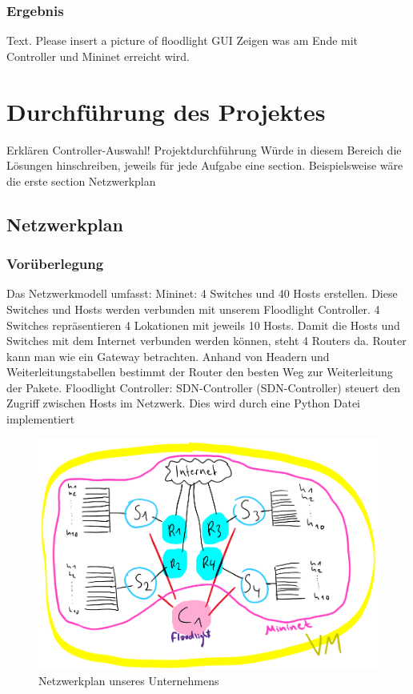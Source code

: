 \documentclass[fontsize=12pt,paper=a4,open=any,parskip=half,
  twoside=false,toc=listof,toc=bibliography,fleqn,leqno,
  captions=nooneline,captions=tableabove,british]{scrbook}
\begin{document}
\subsection{Ergebnis}
Text. Please insert a picture of floodlight GUI
Zeigen was am Ende mit Controller und Mininet erreicht wird.



\chapter{Durchführung des Projektes}
Erklären Controller-Auswahl!
Projektdurchführung
Würde in diesem Bereich die Lösungen hinschreiben, jeweils für jede Aufgabe eine section. Beispielsweise wäre die erste section Netzwerkplan



\section{Netzwerkplan}
\subsection{Vorüberlegung}
Das Netzwerkmodell umfasst:
Mininet: 4 Switches und 40 Hosts erstellen. Diese Switches und Hosts werden verbunden mit unserem Floodlight Controller. 4 Switches repräsentieren 4 Lokationen mit jeweils 10 Hosts. Damit die Hosts und Switches mit dem Internet verbunden werden können, steht 4 Routers da. Router kann man wie ein Gateway betrachten. Anhand von Headern und Weiterleitungstabellen bestimmt der Router den besten Weg zur Weiterleitung der Pakete.
Floodlight Controller: SDN-Controller (SDN-Controller) steuert den Zugriff zwischen Hosts im Netzwerk. Dies wird durch eine Python Datei implementiert

\begin{figure}[htbp]
 \centering
 \includegraphics[width=1.0\textwidth]{Bilder/prototyp}
 \captionsetup{justification=centering,margin=2cm}
 \caption{Netzwerkplan unseres Unternehmens}
 \label{networkplan}
\end{figure}
\end{document}
